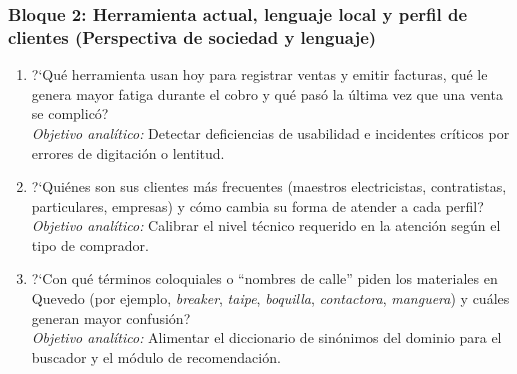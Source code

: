 \subsubsection*{Bloque 2: Herramienta actual, lenguaje local y perfil de clientes (Perspectiva de sociedad y lenguaje)}
\begin{enumerate}[label=\textbf{P\arabic*.},resume,leftmargin=26pt,itemsep=3pt]
    \item ?`Qu\'e herramienta usan hoy para registrar ventas y emitir facturas, qu\'e le genera mayor fatiga durante el cobro y qu\'e pas\'o la \'ultima vez que una venta se complic\'o?\\
    {\footnotesize\textit{Objetivo anal\'itico:} Detectar deficiencias de usabilidad e incidentes cr\'iticos por errores de digitaci\'on o lentitud.}
    \item ?`Qui\'enes son sus clientes m\'as frecuentes (maestros electricistas, contratistas, particulares, empresas) y c\'omo cambia su forma de atender a cada perfil?\\
    {\footnotesize\textit{Objetivo anal\'itico:} Calibrar el nivel t\'ecnico requerido en la atenci\'on seg\'un el tipo de comprador.}
    \item ?`Con qu\'e t\'erminos coloquiales o \enquote{nombres de calle} piden los materiales en Quevedo (por ejemplo, \emph{breaker}, \emph{taipe}, \emph{boquilla}, \emph{contactora}, \emph{manguera}) y cu\'ales generan mayor confusi\'on?\\
    {\footnotesize\textit{Objetivo anal\'itico:} Alimentar el diccionario de sin\'onimos del dominio para el buscador y el m\'odulo de recomendaci\'on.}
\end{enumerate}

